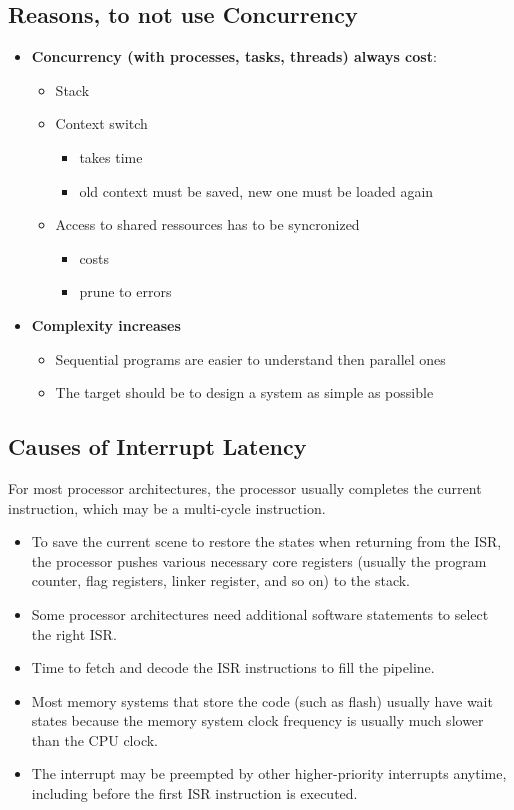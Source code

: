 \subsection{Reasons, to not use Concurrency}
\begin{itemize}
  \item \textbf{Concurrency (with processes, tasks, threads) always \glqq cost\grqq}:
        \begin{itemize}
          \item Stack
          \item Context switch
                \begin{itemize}
                  \item takes time
                  \item old context must be saved, new one must be loaded again
                \end{itemize}
          \item Access to shared ressources has to be syncronized
                \begin{itemize}
                  \item costs
                  \item prune to errors
                \end{itemize}
        \end{itemize}
  \item \textbf{Complexity increases}
        \begin{itemize}
          \item Sequential programs are easier to understand then parallel ones
          \item The target should be to design a system as simple as possible
        \end{itemize}
\end{itemize}

\subsection{Causes of Interrupt Latency}
For most processor architectures, the processor usually completes the current instruction, which may be a multi-cycle instruction.
\begin{itemize}
  \item To save the current scene to restore the states when returning from the ISR, the processor pushes various necessary core registers (usually the program counter, flag registers, linker register, and so on) to the stack.
  \item Some processor architectures need additional software statements to select the right ISR.
  \item Time to fetch and decode the ISR instructions to fill the pipeline.
  \item Most memory systems that store the code (such as flash) usually have wait states because the memory system clock frequency is usually much slower than the CPU clock.
  \item The interrupt may be preempted by other higher-priority interrupts anytime, including before the first ISR instruction is executed.
\end{itemize}

